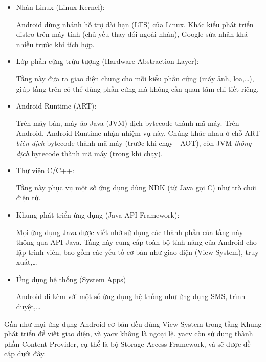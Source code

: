 \documentclass[../../thesis]{subfiles}
\begin{document}
\begin{itemize}
    \item
        Nhân Linux (Linux Kernel):

        Android dùng nhánh hỗ trợ dài hạn (LTS) của Linux. Khác kiểu phát triển
        distro trên máy tính (chủ yếu thay đổi ngoài nhân), Google sửa nhân khá
        nhiều trước khi tích hợp.
    \item
        Lớp phần cứng trừu tượng (Hardware Abstraction Layer):

        Tầng này đưa ra giao diện chung cho mỗi kiểu phần cứng (máy ảnh,
        loa,\ldots), giúp tầng trên có thể dùng phần cứng mà không cần quan tâm
        chi tiết riêng.
    \item
        Android Runtime (ART):

        Trên máy bàn, máy ảo Java (JVM) dịch bytecode thành mã máy. Trên
        Android, Android Runtime nhận nhiệm vụ này. Chúng khác nhau ở chỗ ART
        \emph{biên dịch} bytecode thành mã máy (trước khi chạy - AOT), còn JVM
        \emph{thông dịch} bytecode thành mã máy (trong khi chạy).
\end{itemize}

\begin{itemize}[resume, before = \vspace*{-\dimexpr\topsep+\partopsep\relax}]
    \item
        Thư viện C/C++:

        Tầng này phục vụ một số ứng dụng dùng NDK (từ Java gọi C) như trò chơi
        điện tử.
    \item
        Khung phát triển ứng dụng (Java API Framework):

        Mọi ứng dụng Java được viết nhờ sử dụng các thành phần của tầng này
        thông qua API Java. Tầng này cung cấp toàn bộ tính năng của Android cho
        lập trình viên, bao gồm các yếu tố cơ bản như giao diện (View System),
        truy xuất,\ldots
    \item
        Ứng dụng hệ thống (System Apps)

        Android đi kèm với một số ứng dụng hệ thống như ứng dụng SMS, trình
        duyệt,\ldots{}
\end{itemize}

Gần như mọi ứng dụng Android cơ bản đều dùng View System trong tầng Khung phát
triển để viết giao diện, và yacv không là ngoại lệ. yacv còn sử dụng thành phần
Content Provider, cụ thể là bộ Storage Access Framework, và sẽ được đề cập dưới
đây.
\end{document}

